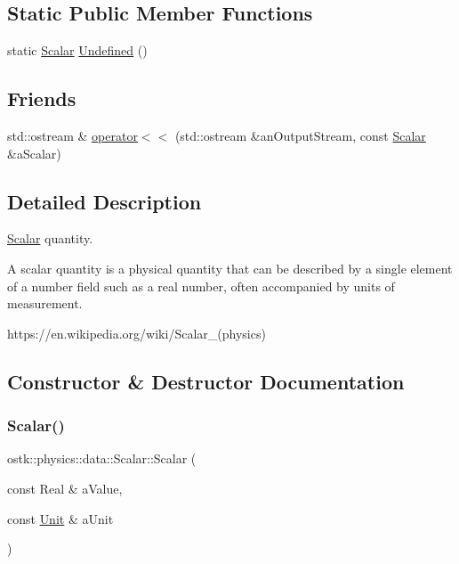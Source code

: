\subsection*{Static Public Member Functions}
\begin{DoxyCompactItemize}
\item 
static \hyperlink{classostk_1_1physics_1_1data_1_1_scalar}{Scalar} \hyperlink{classostk_1_1physics_1_1data_1_1_scalar_a5f261e9c75633f5fa0ac5b5d892241fe}{Undefined} ()
\end{DoxyCompactItemize}
\subsection*{Friends}
\begin{DoxyCompactItemize}
\item 
std\+::ostream \& \hyperlink{classostk_1_1physics_1_1data_1_1_scalar_ac5e6ec203257e2dbec9f528ff111aa52}{operator$<$$<$} (std\+::ostream \&an\+Output\+Stream, const \hyperlink{classostk_1_1physics_1_1data_1_1_scalar}{Scalar} \&a\+Scalar)
\end{DoxyCompactItemize}


\subsection{Detailed Description}
\hyperlink{classostk_1_1physics_1_1data_1_1_scalar}{Scalar} quantity. 

A scalar quantity is a physical quantity that can be described by a single element of a number field such as a real number, often accompanied by units of measurement.

https\+://en.wikipedia.\+org/wiki/\+Scalar\+\_\+(physics) 

\subsection{Constructor \& Destructor Documentation}
\mbox{\label{classostk_1_1physics_1_1data_1_1_scalar_a9c81732bf949003d9a613680d183c3af}} 
\subsubsection{\texorpdfstring{Scalar()}{Scalar()}}
{\footnotesize\ttfamily ostk\+::physics\+::data\+::\+Scalar\+::\+Scalar (\begin{DoxyParamCaption}\item[{const Real \&}]{a\+Value,  }\item[{const \hyperlink{classostk_1_1physics_1_1_unit}{Unit} \&}]{a\+Unit }\end{DoxyParamCaption})}



